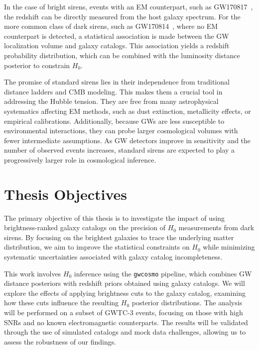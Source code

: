 In the case of bright sirens, events with an \ac{EM} counterpart, such as GW170817~\citep{LIGOScientific:2017adf}, the redshift can be directly measured from the host galaxy spectrum. For the more common class of dark sirens, such as GW170814~\citep{DES:2019ccw}, where no \ac{EM} counterpart is detected, a statistical association is made between the \ac{GW} localization volume and galaxy catalogs. This association yields a redshift probability distribution, which can be combined with the luminosity distance posterior to constrain $H_0$.

The promise of standard sirens lies in their independence from traditional distance ladders and \ac{CMB} modeling. This makes them a crucial tool in addressing the Hubble tension. They are free from many astrophysical systematics affecting \ac{EM} methods, such as dust extinction, metallicity effects, or empirical calibrations. Additionally, because \acp{GW} are less susceptible to environmental interactions, they can probe larger cosmological volumes with fewer intermediate assumptions. As \ac{GW} detectors improve in sensitivity and the number of observed events increases, standard sirens are expected to play a progressively larger role in cosmological inference.

\section{Thesis Objectives}
The primary objective of this thesis is to investigate the impact of using brightness-ranked galaxy catalogs on the precision of $H_0$ measurements from dark sirens. By focusing on the brightest galaxies to trace the underlying matter distribution, we aim to improve the statistical constraints on $H_0$ while minimizing systematic uncertainties associated with galaxy catalog incompleteness.

This work involves $H_0$ inference using the \texttt{gwcosmo} pipeline, which combines \ac{GW} distance posteriors with redshift priors obtained using galaxy catalogs. We will explore the effects of applying brightness cuts to the galaxy catalog, examining how these cuts influence the resulting $H_0$ posterior distributions. The analysis will be performed on a subset of \ac{GWTC}-3 events, focusing on those with high \acp{SNR} and no known electromagnetic counterparts. The results will be validated through the use of simulated catalogs and mock data challenges, allowing us to assess the robustness of our findings.

